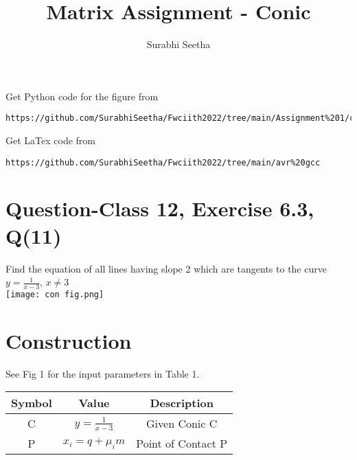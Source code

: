 \documentclass[journal,12pt,twocolumn]{IEEEtran}
\begin{document}
\makeatother
\let\StandardTheFigure\thefigure
\let\vec\mathbf
\renewcommand{\thefigure}{\theproblem}
\def\putbox#1#2#3{\makebox[0in][l]{\makebox[#1][l]{}\raisebox{\baselineskip}[0in][0in]{\raisebox{#2}[0in][0in]{#3}}}}
     \def\rightbox#1{\makebox[0in][r]{#1}}
     \def\centbox#1{\makebox[0in]{#1}}
     \def\topbox#1{\raisebox{-\baselineskip}[0in][0in]{#1}}
     \def\midbox#1{\raisebox{-0.5\baselineskip}[0in][0in]{#1}}
\vspace{3cm}
\title{\textbf{Matrix Assignment - Conic} }
\author{Surabhi Seetha}
\maketitle
\newpage
\bigskip
\renewcommand{\thefigure}{\theenumi}
\renewcommand{\thetable}{\theenumi}
Get Python code for the figure from 
\begin{lstlisting}
https://github.com/SurabhiSeetha/Fwciith2022/tree/main/Assignment%201/codes/src
\end{lstlisting}
Get LaTex code from
\begin{lstlisting}
https://github.com/SurabhiSeetha/Fwciith2022/tree/main/avr%20gcc
\end{lstlisting}
%
\section{Question-Class 12, Exercise 6.3, Q(11)}
\raggedright
Find the equation of all lines having slope 2 which are tangents to the curve $y=\frac{1}{x-3}$, $x\neq{3}$ \\
\vspace{0.25cm}
\texttt{[image: con fig.png]}\\
\label{fig:circle_1}

 \section*{Construction}
 
See Fig 1 for the input parameters in Table 1.\\
\vspace{0.5cm}
{\setlength\extrarowheight{2pt}
\begin{tabular}{|c|c|c|}
	\hline
	\textbf{Symbol}&\textbf{Value}&\textbf{Description}\\
	\hline
	C & $y = \frac{1}{x-3}$ & Given Conic C\\
	\hline
	P & $x_i = q + \mu_i m$ & Point of Contact P\\
	\hline
\end{tabular}
}\\
\vspace{0.25cm}
\\
\end{document}
